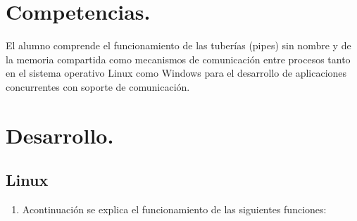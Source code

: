 \documentclass[12pt]{article}
\begin{document}
\section{Competencias.}
El alumno comprende el funcionamiento de las tuberías (pipes) sin nombre y de la memoria compartida como mecanismos de comunicación entre procesos tanto en el sistema operativo Linux como Windows para el desarrollo de aplicaciones concurrentes con soporte de comunicación.
\section{Desarrollo.}
    \subsection{Linux}
    \begin{enumerate}
    
    \item Acontinuación se explica el funcionamiento de las siguientes funciones: 
    

\end{enumerate}
\end{document}
